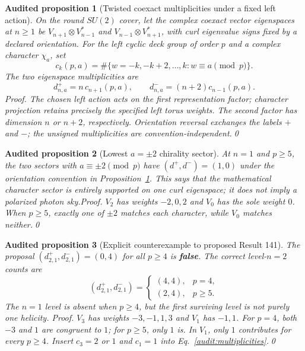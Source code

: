 \documentclass[aps,prd,onecolumn,notitlepage,groupedaddress,11pt]{revtex4-2}
\newtheorem{auditprop}{Audited proposition}[section]
\begin{document}
\begin{auditprop}[Twisted coexact multiplicities under a fixed left action]\label{audit:coexact}
On the round $SU(2)$ cover, let the complex coexact vector eigenspaces at $n\ge1$ be $V_{n+1}\otimes V_{n-1}^*$ and $V_{n-1}\otimes V_{n+1}^*$, with curl eigenvalue signs fixed by a declared orientation. For the left cyclic deck group of order $p$ and a complex character $\chi_a$, set
\begin{equation}\label{audit:counts}
 c_k(p,a)=\#\{w=-k,-k+2,\ldots,k: w\equiv a\pmod p\}.
\end{equation}
The two eigenspace multiplicities are
\begin{equation}\label{audit:multiplicities}
 d_{n,a}^{+}=n\,c_{n+1}(p,a),\qquad d_{n,a}^{-}=(n+2)c_{n-1}(p,a).
\end{equation}
\emph{Proof.} The chosen left action acts on the first representation factor; character projection retains precisely the specified left torus weights. The second factor has dimension $n$ or $n+2$, respectively. Orientation reversal exchanges the labels $+$ and $-$; the unsigned multiplicities are convention-independent.\qed
\end{auditprop}

\begin{auditprop}[Lowest $a=\pm2$ chirality sector]\label{audit:a2}
At $n=1$ and $p\ge5$, the two sectors with $a\equiv\pm2\pmod p$ have $(d^+,d^-)=(1,0)$ under the orientation convention in Proposition~\ref{audit:coexact}. This says that the \emph{mathematical character sector} is entirely supported on one curl eigenspace; it does not imply a polarized photon sky.\emph{Proof.} $V_2$ has weights $-2,0,2$ and $V_0$ has the sole weight $0$. When $p\ge5$, exactly one of $\pm2$ matches each character, while $V_0$ matches neither.\qed
\end{auditprop}

\begin{auditprop}[Explicit counterexample to proposed Result 141]\label{audit:a1}
The proposal $(d^+_{2,1},d^-_{2,1})=(0,4)$ for all $p\ge4$ is \textbf{false}. The correct level-$n=2$ counts are
\begin{equation}\label{audit:a1result}
 (d^+_{2,1},d^-_{2,1})=\begin{cases}(4,4),&p=4,\\(2,4),&p\ge5.\end{cases}
\end{equation}
The $n=1$ level is absent when $p\ge4$, but the first surviving level is \emph{not} purely one helicity. \emph{Proof.} $V_3$ has weights $-3,-1,1,3$ and $V_1$ has $-1,1$. For $p=4$, both $-3$ and $1$ are congruent to $1$; for $p\ge5$, only $1$ is. In $V_1$, only $1$ contributes for every $p\ge4$. Insert $c_3=2$ or $1$ and $c_1=1$ into Eq.~\eqref{audit:multiplicities}.\qed
\end{auditprop}
\end{document}
